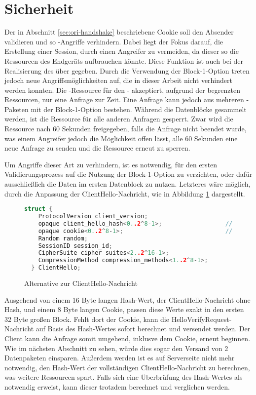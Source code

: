 \section{Sicherheit}

Der in Abschnitt \ref{sec:ori-handshake} beschriebene Cookie soll den Absender validieren und so -Angriffe verhindern.
Dabei liegt der Fokus darauf, die Erstellung einer Session, durch einen Angreifer zu vermeiden, da dieser so die Ressourcen des Endgeräts aufbrauchen könnte.
Diese Funktion ist auch bei der Realisierung des  über  gegeben. Durch die Verwendung der Block-1-Option treten jedoch neue
Angriffsmöglichkeiten auf, die in dieser Arbeit nicht verhindert werden konnten. Die -Ressource für den - akzeptiert, aufgrund
der begrenzten Ressourcen, nur eine Anfrage zur Zeit. Eine Anfrage kann jedoch aus mehreren -Paketen mit der Block-1-Option bestehen. Während
die Datenblöcke gesammelt werden, ist die Ressource für alle anderen Anfragen gesperrt. Zwar wird die Ressource nach 60 Sekunden freigegeben, falls die Anfrage
nicht beendet wurde, was einem Angreifer jedoch die Möglichkeit offen lässt, alle 60 Sekunden eine neue Anfrage zu senden und die Ressource erneut zu sperren.

Um Angriffe dieser Art zu verhindern, ist es notwendig, für den ersten Validierungsprozess auf die Nutzung der Block-1-Option zu verzichten, oder dafür ausschließlich
die Daten im ersten Datenblock zu nutzen. Letzteres wäre möglich, durch die Anpassung der ClientHello-Nachricht, wie in Abbildung \ref{fig:clienthelloalternative} dargestellt.

\begin{figure}[ht]
  \centering
  \begin{lstlisting}[language=c]
  struct {
    ProtocolVersion client_version;
    opaque client_hello_hash<0..2^8-1>;                  // New field
    opaque cookie<0..2^8-1>;                             // New field
    Random random;
    SessionID session_id;
    CipherSuite cipher_suites<2..2^16-1>;
    CompressionMethod compression_methods<1..2^8-1>;
  } ClientHello;
  \end{lstlisting}
  \caption{Alternative zur ClientHello-Nachricht}
  \label{fig:clienthelloalternative}
\end{figure}

Ausgehend von einem 16 Byte langen Hash-Wert, der ClientHello-Nachricht ohne Hash, und einem 8 Byte langen Cookie, passen diese Werte exakt in den ersten 32 Byte großen
Block. Fehlt dort der Cookie, kann die HelloVerifyRequest-Nachricht auf Basis des Hash-Wertes sofort berechnet und versendet werden. Der Client kann die Anfrage somit
umgehend, inklusve dem Cookie, erneut beginnen. Wie im nächsten Abschnitt zu sehen, würde dies sogar den Versand von 2 Datenpaketen einsparen. Außerdem werden ist es
auf Serverseite nicht mehr notwendig, den Hash-Wert der vollständigen ClientHello-Nachricht zu berechnen, was weitere Ressourcen spart. Falls sich eine Überbrüfung des
Hash-Wertes als notwendig erweist, kann dieser trotzdem berechnet und verglichen werden.